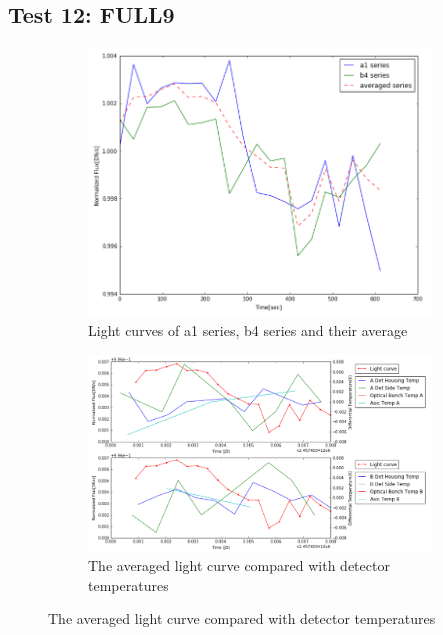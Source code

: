 \documentclass[conference]{IEEEtran}
\begin{document}
\subsection{Test 12: FULL9} 
\begin{figure}[H]
    \centering
    \begin{subfigure}{1}
        \includegraphics[scale=0.4]{ts_test12}
        \caption{Light curves of a1 series, b4 series and their average}
    \end{subfigure}

    \begin{subfigure}{2}
        \includegraphics[scale=0.4]{temp_test12}
        \caption{The averaged light curve compared with detector temperatures}
    \end{subfigure}
   

\end{figure}
\end{document}
